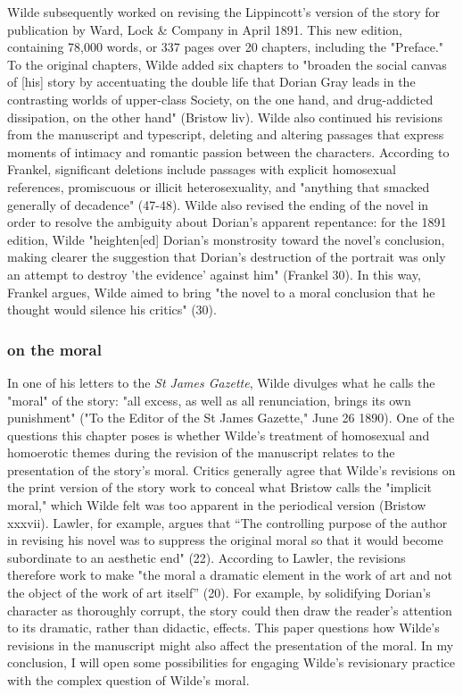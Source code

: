 \documentclass[11pt]{article}
\begin{document}
Wilde subsequently worked on revising the Lippincott’s version of the
story for publication by Ward, Lock \& Company in April 1891. This new
edition, containing 78,000 words, or 337 pages over 20 chapters,
including the "Preface." To the original chapters, Wilde added six
chapters to "broaden the social canvas of [his] story by accentuating
the double life that Dorian Gray leads in the contrasting worlds of
upper-class Society, on the one hand, and drug-addicted dissipation,
on the other hand" (Bristow liv). Wilde also continued his revisions
from the manuscript and typescript, deleting and altering passages
that express moments of intimacy and romantic passion between the
characters. According to Frankel, significant deletions include
passages with explicit homosexual references, promiscuous or illicit
heterosexuality, and "anything that smacked generally of decadence"
(47-48). Wilde also revised the ending of the novel in order to
resolve the ambiguity about Dorian’s apparent repentance: for the 1891
edition, Wilde "heighten[ed] Dorian’s monstrosity toward the novel’s
conclusion, making clearer the suggestion that Dorian’s destruction of
the portrait was only an attempt to destroy 'the evidence' against
him" (Frankel 30). In this way, Frankel argues, Wilde aimed to bring
"the novel to a moral conclusion that he thought would silence his
critics" (30).

\subsubsection{on the moral}
\label{sec:org1850ce2}

In one of his letters to the \emph{St James Gazette}, Wilde divulges what
he calls the "moral" of the story: "all excess, as well as all
renunciation, brings its own punishment" ("To the Editor of the St
James Gazette," June 26 1890). One of the questions this chapter poses
is whether Wilde’s treatment of homosexual and homoerotic themes
during the revision of the manuscript relates to the presentation of
the story’s moral. Critics generally agree that Wilde's revisions on
the print version of the story work to conceal what Bristow calls the
"implicit moral," which Wilde felt was too apparent in the periodical
version (Bristow xxxvii). Lawler, for example, argues that “The
controlling purpose of the author in revising his novel was to
suppress the original moral so that it would become subordinate to an
aesthetic end" (22). According to Lawler, the revisions therefore work
to make "the moral a dramatic element in the work of art and not the
object of the work of art itself” (20). For example, by solidifying
Dorian’s character as thoroughly corrupt, the story could then draw
the reader’s attention to its dramatic, rather than didactic,
effects. This paper questions how Wilde’s revisions in the manuscript
might also affect the presentation of the moral. In my conclusion, I
will open some possibilities for engaging Wilde’s revisionary practice
with the complex question of Wilde’s moral.
\end{document}
